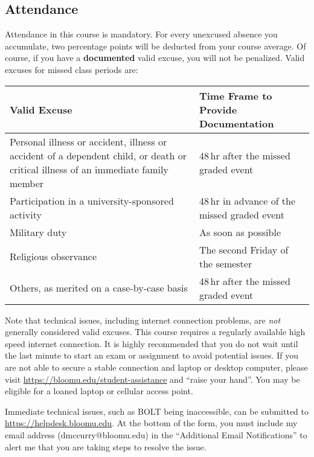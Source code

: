 \documentclass[11pt,letterpaper]{article}
\begin{document}
\subsection{Attendance}

Attendance in this course is mandatory. For every unexcused absence you
accumulate, two percentage points will be deducted from your course
average. Of course, if you have a \textbf{documented} valid excuse, you
will not be penalized. Valid excuses for missed class periods are:


	\begin{center}
		\renewcommand\arraystretch{1.25}
\begin{tabularx}{\linewidth} {X X}
	\toprule
	\bfseries Valid Excuse & \bfseries Time Frame to Provide Documentation
	\\ \midrule
	Personal illness or accident, illness or accident of a dependent child,
	or death or critical illness of an immediate family member &
	48\,hr after the missed graded event \\
	Participation in a university-sponsored activity &
	48\,hr in advance of the missed graded event \\
	Military duty & As soon as possible \\
	Religious observance & The second Friday of the semester \\
	Others, as merited on a case-by-case basis & 48\,hr after the
	missed graded event \\
	\bottomrule
\end{tabularx}
\end{center}

Note that technical issues, including internet connection problems, are
\emph{not} generally considered valid excuses. This course requires a regularly
available high speed internet connection. It is highly recommended that you do
not wait until the last minute to start an exam or assignment to avoid potential
issues. If you are not able to secure a stable connection and laptop or desktop
computer, please visit \url{https://bloomu.edu/student-assistance} and ``raise
your hand''. You may be eligible for a loaned laptop or cellular access point.

Immediate technical issues, such as BOLT being inaccessible, can be submitted to
\url{https://helpdesk.bloomu.edu}. At the bottom of the form, you must include
my email address (dmccurry@bloomu.edu) in the ``Additional Email Notifications''
to alert me that you are taking steps to resolve the issue.
\end{document}
